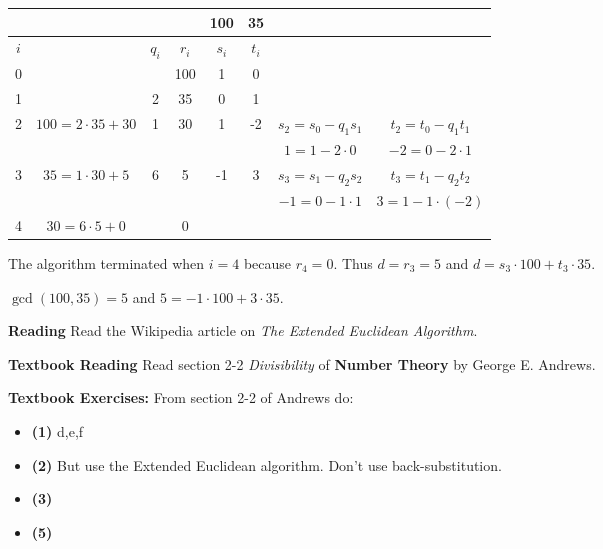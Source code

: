 \documentclass[oneside,12pt]{amsart}
\begin{document}
\begin{tabular}{|c|c|c|c|c|c|c|c|}
\hline
\quad & \quad                     & \quad       & \quad & 100    &  35   &  \quad                   & \quad \\ \hline
$i$   & \quad                     & $q_{i}$     & $r_i$ & $s_i$  & $t_i$ &  \quad                   & \quad \\ \hline\hline
0     & \quad                     & \quad       & 100   &  1     & 0     &  \quad                   & \quad \\ \hline
1     & \quad                     &  2          &  35   &  0     & 1     &  \quad                   & \quad \\ \hline
2     & $100=2\cdot35 + 30$       &  1          &  30   &  1     & -2    & $s_2 = s_0 - q_1 s_1$    & $t_2 = t_0 - q_1 t_1$  \\
\quad & \quad                     & \quad       & \quad & \quad  & \quad & $1 =   1 - 2 \cdot 0$    & $-2=0-2\cdot1$ \\ \hline
3     &3$5 = 1\cdot 30 + 5$       &  6          &   5   &  -1    & 3     & $s_3 = s_1 - q_2 s_2$    & $t_3 = t_1 - q_2 t_2$  \\
\quad & \quad                     & \quad       & \quad & \quad  & \quad & $-1 =   0 - 1 \cdot 1$   & $3=1-1\cdot(-2)$ \\ \hline
4     & $30 = 6\cdot 5 + 0$       &             &   0   &        &       &                          &                \\ \hline
\end{tabular}

\bigskip

The algorithm terminated when $i=4$ because $r_4=0$. Thus $d=r_3=5$ and 
$d = s_3\cdot 100 + t_3 \cdot 35$.

\bigskip
$\gcd(100,35) = 5$ and $5 = -1 \cdot 100 + 3 \cdot 35$.

\bigskip

\textbf{Reading} Read the Wikipedia article on \emph{The Extended Euclidean Algorithm}.

\bigskip

\textbf{Textbook Reading} Read section 2-2 \emph{Divisibility} of \textbf{Number Theory} by George E. Andrews.

\bigskip

\textbf{Textbook Exercises:} From section 2-2 of Andrews do:
\begin{itemize}
\item \textbf{(1)} d,e,f
\item \textbf{(2)} But use the Extended Euclidean algorithm. Don't use back-substitution.
\item \textbf{(3)}
\item \textbf{(5)}
\end{itemize}
\end{document}
